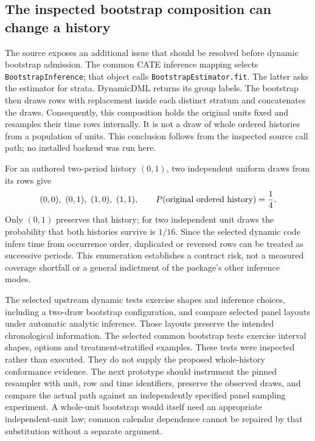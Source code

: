 \subsection{The inspected bootstrap composition can change a history}
\label{exec19:econml-bootstrap}

The source exposes an additional issue that should be resolved before dynamic
bootstrap admission. The common CATE inference mapping selects
\texttt{BootstrapInference}; that object calls \texttt{BootstrapEstimator.fit}.
The latter asks the estimator for strata. DynamicDML returns its group labels.
The bootstrap then draws rows with replacement inside each distinct stratum
and concatenates the draws. Consequently, this composition holds the original
units fixed and resamples their time rows internally. It is not a draw of
whole ordered histories from a population of units. This conclusion follows
from the inspected source call path; no installed backend was run here.
\citep{exec19_econml_source}

For an authored two-period history $(0,1)$, two independent uniform draws from
its rows give
\begin{equation}
 (0,0),\ (0,1),\ (1,0),\ (1,1),
 \qquad P(\hbox{original ordered history})=\frac14.
 \label{exec19:econml-resampling}
\end{equation}
Only $(0,1)$ preserves that history; for two independent unit draws the
probability that both histories survive is $1/16$. Since the selected dynamic
code infers time from occurrence order, duplicated or reversed rows can be
treated as successive periods. This enumeration establishes a contract risk,
not a measured coverage shortfall or a general indictment of the package's
other inference modes.~\citep{exec19_econml_reference}

The selected upstream dynamic tests exercise shapes and inference choices,
including a two-draw bootstrap configuration, and compare selected panel
layouts under automatic analytic inference. Those layouts preserve the
intended chronological information. The selected common bootstrap tests
exercise interval shapes, options and treatment-stratified examples. These
tests were inspected rather than executed. They do not supply the proposed
whole-history conformance evidence. The next prototype should instrument the
pinned resampler with unit, row and time identifiers, preserve the observed
draws, and compare the actual path against an independently specified panel
sampling experiment. A whole-unit bootstrap would itself need an appropriate
independent-unit law; common calendar dependence cannot be repaired by that
substitution without a separate argument.~\citep{exec19_econml_source}

